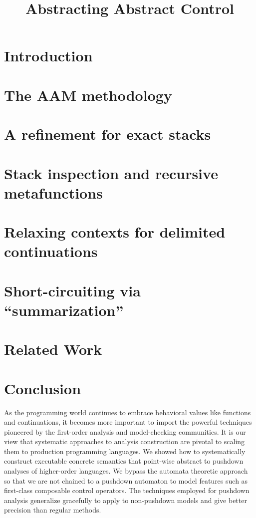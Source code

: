 \documentclass[preprint,nocopyrightspace]{sigplanconf}
\title{Abstracting Abstract Control}
\begin{document}
\maketitle


\begin{abstract}

\end{abstract}

\section{Introduction}

\section{The AAM methodology}
\label{sec:aam}

\section{A refinement for exact stacks}\label{sec:pushdown}

\section{Stack inspection and recursive metafunctions}
\label{sec:inspection}

\section{Relaxing contexts for delimited continuations}\label{sec:delim}

\section{Short-circuiting via ``summarization''}\label{sec:memo}

\section{Related Work}

\section{Conclusion}
As the programming world continues to embrace behavioral values like functions and continuations, it becomes more important to import the powerful techniques pioneered by the first-order analysis and model-checking communities.
%
It is our view that systematic approaches to analysis construction are pivotal to scaling them to production programming languages.
%
We showed how to systematically construct executable concrete semantics that point-wise abstract to pushdown analyses of higher-order languages.
%
We bypass the automata theoretic approach so that we are not chained to a pushdown automaton to model features such as first-class composable control operators.
%
The techniques employed for pushdown analysis generalize gracefully to apply to non-pushdown models and give better precision than regular methods.

\balance


\end{document}
